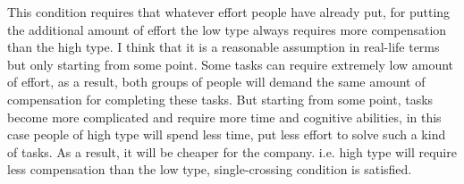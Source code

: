 \documentclass[a4paper]{article}
\begin{document}
			This condition requires that whatever effort people have already put, for putting the additional amount of effort the low type always requires more compensation than the high type. I think that it is a reasonable assumption in real-life terms but only starting from some point. Some tasks can require extremely low amount of effort, as a result, both groups of people will demand the same amount of compensation for completing these tasks. But starting from some point, tasks become more complicated and require more time and cognitive abilities, in this case people of high type will spend less time, put less effort to solve such a kind of tasks. As a result, it will be cheaper for the company. i.e. high type will require less compensation than the low type, single-crossing condition is satisfied.
\end{document}
